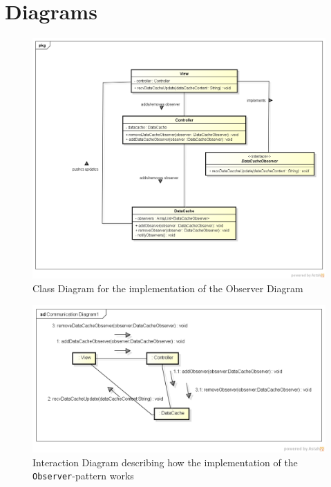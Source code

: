 \documentclass[a4paper]{scrreprt}
\begin{document}
\section{Diagrams}

\begin{figure}[h]
  \begin{center}
    \includegraphics[scale=0.4]{ClassDiagramObserverPattern.png}
    \caption{Class Diagram for the implementation of the Observer Diagram}
    \label{fig:diagobserver}
  \end{center}
\end{figure}

\begin{figure}[h]
  \begin{center}
    \includegraphics[scale=0.6]{ObserverInteractionDiagram.png}
    \caption{Interaction Diagram describing how the implementation of the \texttt{Observer}-pattern works}
    \label{fig:interactobserver}
  \end{center}
\end{figure}
\end{document}
